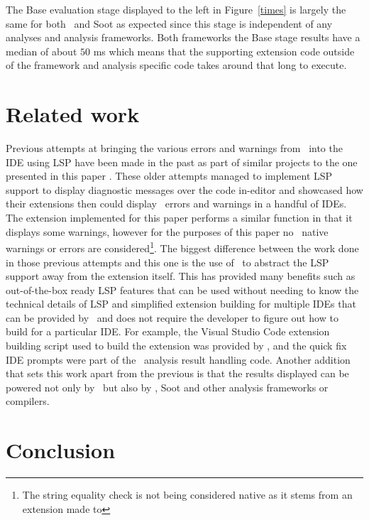 \documentclass[sigplan,10pt]{acmart}
\begin{document}
The Base evaluation stage displayed to the left in Figure~\ref{times} is largely the same for both \intraj\ and Soot as expected since this stage is independent of any analyses and analysis frameworks. Both frameworks the Base stage results have a median of about $50$ ms which means that the supporting extension code outside of the framework and analysis specific code takes around that long to execute. 

\section{Related work}
\label{sec:related}
Previous attempts at bringing the various errors and warnings from \extendj\ into the IDE using LSP have been made in the past as part of similar projects to the one presented in this paper \cite{old1, old2}. These older attempts managed to implement  LSP support to display diagnostic messages over the code in-editor and showcased how their extensions then could display \extendj\ errors and warnings in a handful of IDEs. The extension implemented for this paper performs a similar function in that it displays some warnings, however for the purposes of this paper no \extendj\ native warnings or errors are considered\footnote{The string equality check is not being considered native as it stems from an extension made to \extendj}. The biggest difference between the work done in those previous attempts and this one is the use of \magpie\ to abstract the LSP support away from the extension itself. This has provided many benefits such as out-of-the-box ready LSP features that can be used without needing to know the technical details of LSP and simplified extension building for multiple IDEs that can be provided by \magpie\ and does not require the developer to figure out how to build for a particular IDE. For example, the Visual Studio Code extension building script used to build the extension was provided by \magpie, and the quick fix IDE prompts were part of the \magpie\ analysis result handling code. Another addition that sets this work apart from the previous is that the results displayed can be powered not only by \extendj\ but also by \intraj, Soot and other analysis frameworks or compilers.

\section{Conclusion}
\end{document}

